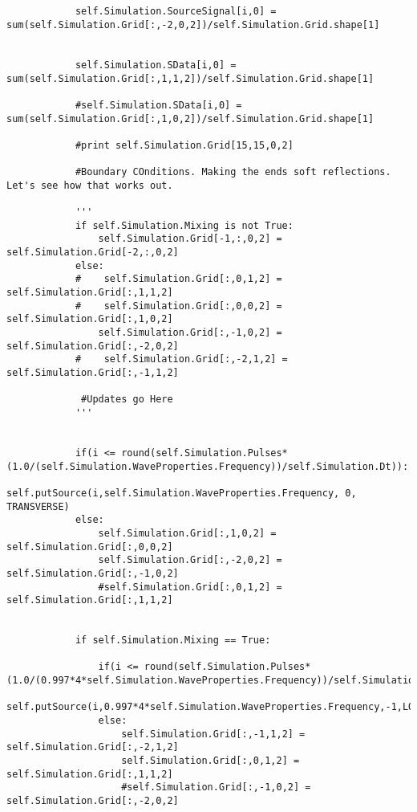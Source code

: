 \begin{lstlisting}
            
            
            self.Simulation.SourceSignal[i,0] = sum(self.Simulation.Grid[:,-2,0,2])/self.Simulation.Grid.shape[1]
             
            
            self.Simulation.SData[i,0] = sum(self.Simulation.Grid[:,1,1,2])/self.Simulation.Grid.shape[1] 
            
            #self.Simulation.SData[i,0] =  sum(self.Simulation.Grid[:,1,0,2])/self.Simulation.Grid.shape[1]  
            
            #print self.Simulation.Grid[15,15,0,2]
            
            #Boundary COnditions. Making the ends soft reflections. Let's see how that works out.

            '''
            if self.Simulation.Mixing is not True:
                self.Simulation.Grid[-1,:,0,2] = self.Simulation.Grid[-2,:,0,2]
            else:
            #    self.Simulation.Grid[:,0,1,2] = self.Simulation.Grid[:,1,1,2]
            #    self.Simulation.Grid[:,0,0,2] = self.Simulation.Grid[:,1,0,2]
                self.Simulation.Grid[:,-1,0,2] = self.Simulation.Grid[:,-2,0,2]
            #    self.Simulation.Grid[:,-2,1,2] = self.Simulation.Grid[:,-1,1,2]

             #Updates go Here
            '''

                                           
            if(i <= round(self.Simulation.Pulses*(1.0/(self.Simulation.WaveProperties.Frequency))/self.Simulation.Dt)):
                self.putSource(i,self.Simulation.WaveProperties.Frequency, 0, TRANSVERSE)
            else:
                self.Simulation.Grid[:,1,0,2] = self.Simulation.Grid[:,0,0,2]
                self.Simulation.Grid[:,-2,0,2] = self.Simulation.Grid[:,-1,0,2]
                #self.Simulation.Grid[:,0,1,2] = self.Simulation.Grid[:,1,1,2]
            
            
            if self.Simulation.Mixing == True:
                
                if(i <= round(self.Simulation.Pulses*(1.0/(0.997*4*self.Simulation.WaveProperties.Frequency))/self.Simulation.Dt)):
                    self.putSource(i,0.997*4*self.Simulation.WaveProperties.Frequency,-1,LONGITUDINAL)
                else: 
                    self.Simulation.Grid[:,-1,1,2] = self.Simulation.Grid[:,-2,1,2]
                    self.Simulation.Grid[:,0,1,2] = self.Simulation.Grid[:,1,1,2]
                    #self.Simulation.Grid[:,-1,0,2] = self.Simulation.Grid[:,-2,0,2]
 

\end{lstlisting}
